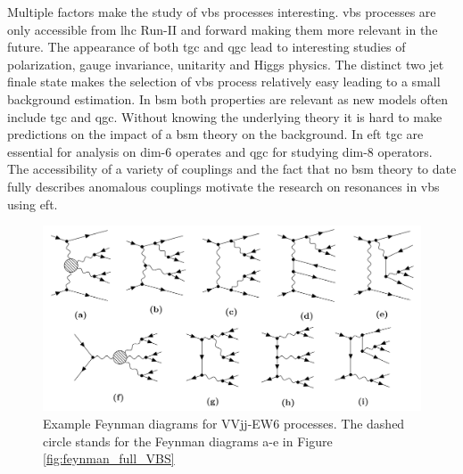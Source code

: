 \documentclass[../Bachelorarbeit.tex]{subfiles}
\begin{document}
Multiple factors make the study of \acrshort{vbs} processes interesting. \acrshort{vbs} processes are only accessible from \acrshort{lhc} Run-II and forward making them more relevant in the future.
The appearance of both \acrshort{tgc} and \acrshort{qgc} lead to interesting studies of polarization, gauge invariance, unitarity and Higgs physics.
The distinct two jet finale state makes the selection of \acrshort{vbs} process relatively easy leading to a small background estimation. In \acrshort{bsm} both properties
are relevant as new models often include \acrshort{tgc} and \acrshort{qgc}. Without knowing the underlying theory it is hard to make predictions on the impact of a \acrshort{bsm} theory on the background.
In \acrshort{eft} \acrshort{tgc} are essential for analysis on dim-6 operates and \acrshort{qgc} for studying dim-8 operators. The accessibility of a variety of couplings and
the fact that no \acrshort{bsm} theory to date fully describes anomalous couplings motivate the research on resonances in \acrshort{vbs} using \acrshort{eft}.
\begin{figure}[h]
    \centering
    \includegraphics[width=\textwidth]{images/EW6.png}
    \caption{Example Feynman diagrams for VVjj-EW6 processes. The dashed circle stands for the Feynman diagrams a-e in Figure \ref*{fig:feynman_full_VBS}}
    \label{fig:EW6}
\end{figure}
\end{document}
